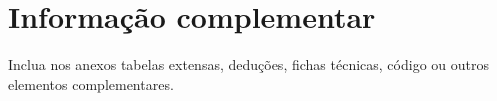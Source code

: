 \chapter{Informação complementar}
Inclua nos anexos tabelas extensas, deduções, fichas técnicas, código ou outros elementos complementares.
